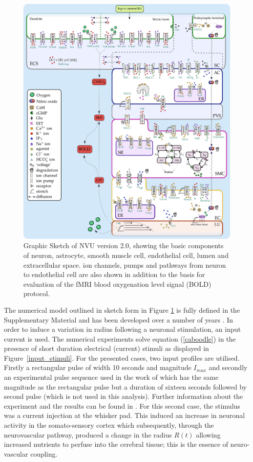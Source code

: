 \begin{figure}[h!]
\centering
\includegraphics[width=0.7\linewidth]{Figures/nvu_20}
\caption[Graphic Sketch of NVU version 2.0]{Graphic Sketch of NVU version 2.0, showing the basic components of neuron, astrocyte, smooth muscle cell, endothelial cell, lumen and extracellular space. ion channels, pumps and pathways from neuron to endothelial cell are also shown in addition to the basis for evaluation of the fMRI blood oxygenation level signal (BOLD) protocol.}
\label{fig:nvu20}
\end{figure}

  
  
The numerical model outlined in sketch form in Figure \ref{fig:nvu20} is fully defined in the Supplementary Material  and has been developed over a number of years \cite{Farr2011,Dormanns2015,Dormanns2016b}. In order to induce a variation in radius following a neuronal stimulation, an input current is used. The numerical experiments solve equation (\ref{caboodle}) in the presence of short duration electrical (current) stimuli as displayed in Figure~\ref{input_stimuli}. For the presented cases, two input profiles are utilised. Firstly a rectangular pulse of width 10 seconds and magnitude  $I_{max}$ and secondly an experimental pulse sequence used in the work of \cite{Zheng2010} which has the same magnitude as the rectangular pulse but a duration of sixteen seconds followed by second pulse (which is not used in this analysis). Further information about the experiment and the results can be found in \cite{Zheng2010}.  For this second case, the stimulus was a current injection at the whisker pad. This induced an increase in neuronal activity in the somato-sensory cortex which subsequently, through the neurovascular pathway, produced a  change in the radius $R(t)$ allowing increased nutrients to perfuse into the cerebral tissue; this is  the essence of neuro-vascular coupling. 


